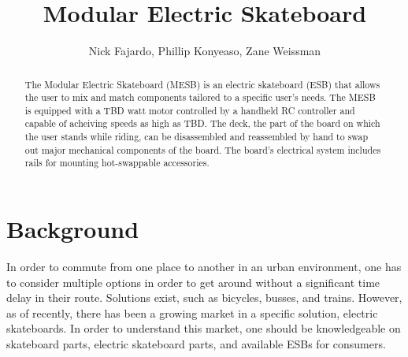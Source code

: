 \documentclass[a4paper,10pt]{article}
\title{Modular Electric Skateboard}
\author{Nick Fajardo, Phillip Konyeaso, Zane Weissman}
\begin{document}
\maketitle

\begin{abstract}
The Modular Electric Skateboard (MESB) is an electric skateboard (ESB) that allows the user to mix and match components tailored to a specific user’s needs. The MESB is equipped with a TBD watt motor controlled by a handheld RC controller and capable of acheiving speeds as high as TBD. The deck, the part of the board on which the user stands while riding, can be disassembled and reassembled by hand to swap out major mechanical components of the board. The board's electrical system includes rails for mounting hot-swappable accessories.

\end{abstract}

\section{Background}
In order to commute from one place to another in an urban environment, one has to consider multiple options in order to get around without a significant time delay in their route. Solutions exist, such as bicycles, busses, and trains. However, as of recently, there has been a growing market in a specific solution, electric skateboards. In order to understand this market, one should be knowledgeable on skateboard parts, electric skateboard parts, and available ESBs for consumers.
\end{document}
